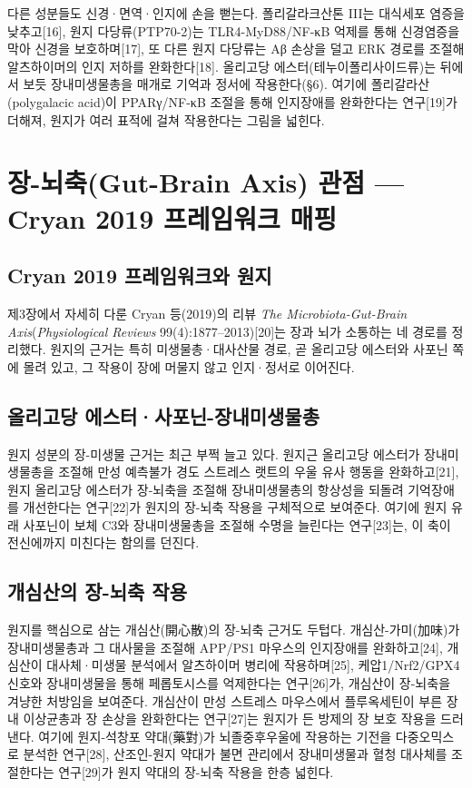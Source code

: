 \documentclass[12pt,oneside]{book}
\begin{document}
다른 성분들도 신경·면역·인지에 손을 뻗는다. 폴리갈라크산톤 III는 대식세포 염증을 낮추고[16], 원지 다당류(PTP70-2)는 TLR4-MyD88/NF-κB 억제를 통해 신경염증을 막아 신경을 보호하며[17], 또 다른 원지 다당류는 Aβ 손상을 덜고 ERK 경로를 조절해 알츠하이머의 인지 저하를 완화한다[18]. 올리고당 에스터(테누이폴리사이드류)는 뒤에서 보듯 장내미생물총을 매개로 기억과 정서에 작용한다(§6). 여기에 폴리갈라산(polygalacic acid)이 PPARγ/NF-κB 조절을 통해 인지장애를 완화한다는 연구[19]가 더해져, 원지가 여러 표적에 걸쳐 작용한다는 그림을 넓힌다.

\section{장-뇌축(Gut-Brain Axis) 관점 — Cryan 2019 프레임워크 매핑}

\subsection{Cryan 2019 프레임워크와 원지}

제3장에서 자세히 다룬 Cryan 등(2019)의 리뷰 \textit{The Microbiota-Gut-Brain Axis}(\textit{Physiological Reviews} 99(4):1877–2013)[20]는 장과 뇌가 소통하는 네 경로를 정리했다. 원지의 근거는 특히 미생물총·대사산물 경로, 곧 올리고당 에스터와 사포닌 쪽에 몰려 있고, 그 작용이 장에 머물지 않고 인지·정서로 이어진다.

\subsection{올리고당 에스터·사포닌-장내미생물총}

원지 성분의 장-미생물 근거는 최근 부쩍 늘고 있다. 원지근 올리고당 에스터가 장내미생물총을 조절해 만성 예측불가 경도 스트레스 랫트의 우울 유사 행동을 완화하고[21], 원지 올리고당 에스터가 장-뇌축을 조절해 장내미생물총의 항상성을 되돌려 기억장애를 개선한다는 연구[22]가 원지의 장-뇌축 작용을 구체적으로 보여준다. 여기에 원지 유래 사포닌이 보체 C3와 장내미생물총을 조절해 수명을 늘린다는 연구[23]는, 이 축이 전신에까지 미친다는 함의를 던진다.

\subsection{개심산의 장-뇌축 작용}

원지를 핵심으로 삼는 개심산(開心散)의 장-뇌축 근거도 두텁다. 개심산-가미(加味)가 장내미생물총과 그 대사물을 조절해 APP/PS1 마우스의 인지장애를 완화하고[24], 개심산이 대사체·미생물 분석에서 알츠하이머 병리에 작용하며[25], 케압1/Nrf2/GPX4 신호와 장내미생물을 통해 페롭토시스를 억제한다는 연구[26]가, 개심산이 장-뇌축을 겨냥한 처방임을 보여준다. 개심산이 만성 스트레스 마우스에서 플루옥세틴이 부른 장내 이상균총과 장 손상을 완화한다는 연구[27]는 원지가 든 방제의 장 보호 작용을 드러낸다. 여기에 원지-석창포 약대(藥對)가 뇌졸중후우울에 작용하는 기전을 다중오믹스로 분석한 연구[28], 산조인-원지 약대가 불면 관리에서 장내미생물과 혈청 대사체를 조절한다는 연구[29]가 원지 약대의 장-뇌축 작용을 한층 넓힌다.
\end{document}
